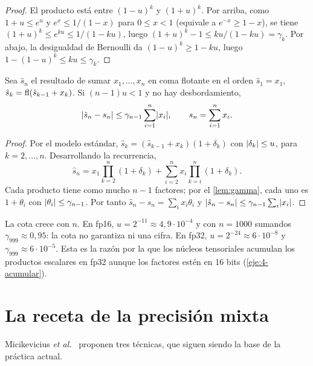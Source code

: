 \begin{proof}
El producto está entre $(1-u)^{k}$ y $(1+u)^{k}$. Por arriba, como $1+u\le e^{u}$ y $e^{x}\le 1/(1-x)$ para $0\le x<1$ (equivale a $e^{-x}\ge 1-x$), se tiene $(1+u)^{k}\le e^{ku}\le 1/(1-ku)$, luego $(1+u)^{k}-1\le ku/(1-ku)=\gamma_k$. Por abajo, la desigualdad de Bernoulli da $(1-u)^{k}\ge 1-ku$, luego $1-(1-u)^{k}\le ku\le\gamma_k$.
\end{proof}

\begin{teorema}\label{teo:suma}
Sea $\hat s_n$ el resultado de sumar $x_1,\dots,x_n$ en coma flotante en el orden $\hat s_1=x_1$, $\hat s_k=\operatorname{fl}(\hat s_{k-1}+x_k)$. Si $(n-1)u<1$ y no hay desbordamiento,
\[
\lvert\hat s_n-s_n\rvert\le\gamma_{n-1}\sum_{i=1}^{n}\lvert x_i\rvert,\qquad s_n=\sum_{i=1}^{n}x_i.
\]
\end{teorema}

\begin{proof}
Por el modelo estándar, $\hat s_k=(\hat s_{k-1}+x_k)(1+\delta_k)$ con $\lvert\delta_k\rvert\le u$, para $k=2,\dots,n$. Desarrollando la recurrencia,
\[
\hat s_n=x_1\prod_{k=2}^{n}(1+\delta_k)+\sum_{i=2}^{n}x_i\prod_{k=i}^{n}(1+\delta_k).
\]
Cada producto tiene como mucho $n-1$ factores; por el \cref{lem:gamma}, cada uno es $1+\theta_i$ con $\lvert\theta_i\rvert\le\gamma_{n-1}$. Por tanto $\hat s_n-s_n=\sum_i x_i\theta_i$ y $\lvert\hat s_n-s_n\rvert\le\gamma_{n-1}\sum_i\lvert x_i\rvert$.
\end{proof}

La cota crece con $n$. En fp16, $u=2^{-11}\approx 4{,}9\cdot 10^{-4}$ y con $n=1000$ sumandos $\gamma_{999}\approx 0{,}95$: la cota no garantiza ni una cifra. En fp32, $u=2^{-24}\approx 6\cdot 10^{-8}$ y $\gamma_{999}\approx 6\cdot 10^{-5}$. Esta es la razón por la que los núcleos tensoriales acumulan los productos escalares en fp32 aunque los factores estén en 16 bits (\cref{eje:4-acumular}).

\section{La receta de la precisión mixta}

Micikevicius \emph{et al.}~\cite[§3]{micikevicius} proponen tres técnicas, que siguen siendo la base de la práctica actual.

